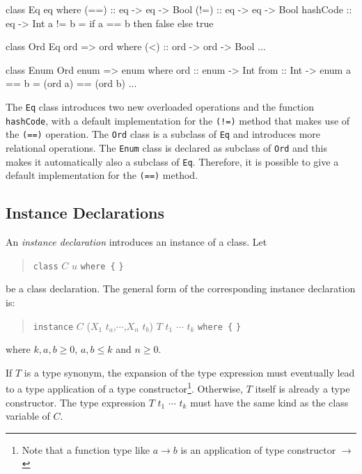 \label{classexample}
\begin{code}
class Eq eq where
    (==) :: eq -> eq -> Bool
    (!=) :: eq -> eq -> Bool
    hashCode :: eq -> Int
    a != b  =  if a == b then false else true

class Ord Eq ord => ord where
    (<)  :: ord -> ord -> Bool
    ...

class Enum Ord enum => enum where
    ord   :: enum -> Int
    from :: Int -> enum
    a == b  =  (ord a) == (ord b)
    ...
\end{code}

The \texttt{Eq} class introduces two new overloaded operations and the function \texttt{hashCode}, 
with a default implementation for the \texttt{(!=)} method that makes use of the \texttt{(==)} operation. 
The \texttt{Ord} class is a subclass of \texttt{Eq} and introduces more relational operations. 
The \texttt{Enum} class is declared as subclass of \texttt{Ord} and this makes it automatically also a subclass of \texttt{Eq}. 
Therefore, it is possible to give a default implementation for the \texttt{(==)} method. 

\subsection{Instance Declarations} \label{instdcl}  

\begin{flushleft}
      
\end{flushleft}

An \emph{instance declaration} introduces an instance of a class. Let
\begin{quote}
\texttt{class} $C$ $u$ \texttt{where \{}  \texttt{\}}
\end{quote}
be a class declaration.
The general form of the corresponding instance declaration is:
\begin{quote}
\texttt{instance} $C$ ($X_1$ $t_a$,$\cdots$,$X_n$ $t_b$) \sym{=>} $T$ $t_1$ $\cdots$ $t_k$ \texttt{where \{}  \texttt{\}}
\end{quote}
where $k,a,b \ge 0$, $a,b \le k$ and $n \ge 0$. 

If $T$ is a type synonym, the expansion of the type expression must eventually lead to a type application of a type constructor\footnote{Note that a function type like $a \rightarrow{} b$ is an application of type constructor
\sym{(}$\rightarrow{}$\sym{)}}. Otherwise, $T$ itself is already a type constructor. The type expression $T$ $t_1$ $\cdots$ $t_k$ must have the same kind as the class variable of $C$.

